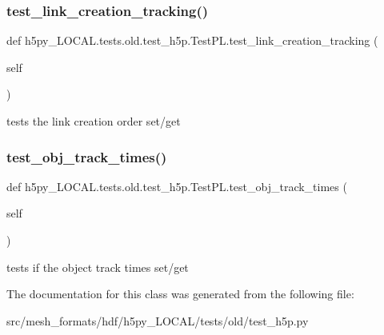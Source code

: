 \subsubsection{\texorpdfstring{test\+\_\+link\+\_\+creation\+\_\+tracking()}{test\_link\_creation\_tracking()}}
{\footnotesize\ttfamily def h5py\+\_\+\+L\+O\+C\+A\+L.\+tests.\+old.\+test\+\_\+h5p.\+Test\+P\+L.\+test\+\_\+link\+\_\+creation\+\_\+tracking (\begin{DoxyParamCaption}\item[{}]{self }\end{DoxyParamCaption})}

\begin{DoxyVerb}tests the link creation order set/get
\end{DoxyVerb}
 \mbox{\label{classh5py__LOCAL_1_1tests_1_1old_1_1test__h5p_1_1TestPL_a1e730b54f209fe7b4c1c1290f645d949}} 
\subsubsection{\texorpdfstring{test\+\_\+obj\+\_\+track\+\_\+times()}{test\_obj\_track\_times()}}
{\footnotesize\ttfamily def h5py\+\_\+\+L\+O\+C\+A\+L.\+tests.\+old.\+test\+\_\+h5p.\+Test\+P\+L.\+test\+\_\+obj\+\_\+track\+\_\+times (\begin{DoxyParamCaption}\item[{}]{self }\end{DoxyParamCaption})}

\begin{DoxyVerb}tests if the object track times  set/get
\end{DoxyVerb}
 

The documentation for this class was generated from the following file\+:\begin{DoxyCompactItemize}
\item 
src/mesh\+\_\+formats/hdf/h5py\+\_\+\+L\+O\+C\+A\+L/tests/old/test\+\_\+h5p.\+py\end{DoxyCompactItemize}
